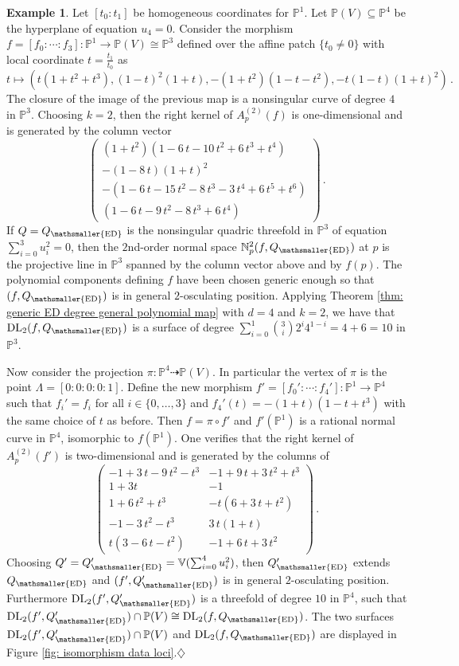 \documentclass[11pt,reqno]{amsart}
\numberwithin{equation}{section}
\theoremstyle{plain}
\numberwithin{theorem}{section}
\theoremstyle{definition}
\newtheorem{example}[theorem]{Example}
\newcommand{\N}{\mathbb{N}}
\renewcommand{\P}{\mathbb{P}}
\newcommand{\V}{\mathbb{V}}
\newcommand{\DL}{\operatorname{DL}}
\newcommand{\mED}{\mathsmaller{\mathrm{ED}}}
\begin{document}
\begin{example}\label{ex: second order DD quartic}
Let $[t_0:t_1]$ be homogeneous coordinates for $\P^1$. Let $\P(V)\subseteq\P^4$ be the hyperplane of equation $u_4=0$. Consider the morphism $f=[f_0:\cdots:f_3]\colon\P^1\to\P(V)\cong\P^3$ defined over the affine patch $\{t_0\neq 0\}$ with local coordinate $t=\frac{t_1}{t_0}$ as
\[
t\mapsto\left(t(1+t^2+t^3),(1-t)^2(1+t),-(1+t^2)(1-t-t^2),-t(1-t)(1+t)^2\right)\,.
\]
The closure of the image of the previous map is a nonsingular curve of degree $4$ in $\P^3$. Choosing $k=2$, then the right kernel of $A_p^{(2)}(f)$ is one-dimensional and is generated by the column vector
\[
\begin{pmatrix}
(1+t^2)(1-6\,t-10\,t^2+6\,t^3+t^4)\\
-(1-8\,t)(1+t)^2\\
-(1-6\,t-15\,t^2-8\,t^3-3\,t^4+6\,t^5+t^6)\\
(1-6\,t-9\,t^2-8\,t^3+6\,t^4)
\end{pmatrix}\,.
\]
If $Q=Q_\mED$ is the nonsingular quadric threefold in $\P^3$ of equation $\sum_{i=0}^3 u_i^2=0$, then the $2$nd-order normal space $\N_p^2(f,Q_\mED)$ at $p$ is the projective line in $\P^3$ spanned by the column vector above and by $f(p)$. The polynomial components defining $f$ have been chosen generic enough so that $(f,Q_\mED)$ is in general $2$-osculating position. Applying Theorem \ref{thm: generic ED degree general polynomial map} with $d=4$ and $k=2$, we have that $\DL_2(f,Q_\mED)$ is a surface of degree $\sum_{i=0}^1\binom{3}{i}2^i4^{1-i}=4+6=10$ in $\P^3$.

Now consider the projection $\pi\colon\P^4\dasharrow\P(V)$. In particular the vertex of $\pi$ is the point $\Lambda=[0:0:0:0:1]$. Define the new morphism $f'=[f_0':\cdots:f_4']\colon\P^1\to\P^4$ such that $f_i'=f_i$ for all $i\in\{0,\dots,3\}$ and $f_4'(t)=-(1+t)(1-t+t^3)$ with the same choice of $t$ as before. Then $f=\pi\circ f'$ and $f'(\P^1)$ is a rational normal curve in $\P^4$, isomorphic to $f(\P^1)$.
One verifies that the right kernel of $A_p^{(2)}(f')$ is two-dimensional and is generated by the columns of
\[
\begin{pmatrix}
-1+3\,t-9\,t^2-t^3 & -1+9\,t+3\,t^2+t^3\\
1+3t & -1\\
1+6\,t^2+t^3 & -t(6+3\,t+t^2)\\
-1-3\,t^2-t^3 & 3\,t(1+t)\\
t(3-6\,t-t^2) & -1+6\,t+3\,t^2
\end{pmatrix}\,.
\]
Choosing $Q'=Q_\mED'=\V(\sum_{i=0}^4 u_i^2)$, then $Q_\mED'$ extends $Q_\mED$ and $(f',Q_\mED')$ is in general $2$-osculating position. Furthermore $\DL_2(f',Q_\mED')$ is a threefold of degree $10$ in $\P^4$, such that $\DL_2(f',Q_\mED')\cap\P(V)\cong \DL_2(f,Q_\mED)$. The two surfaces $\DL_2(f',Q_\mED')\cap\P(V)$ and $\DL_2(f,Q_\mED)$ are displayed in Figure \ref{fig: isomorphism data loci}.\hfill$\diamondsuit$


\end{example}
\end{document}
